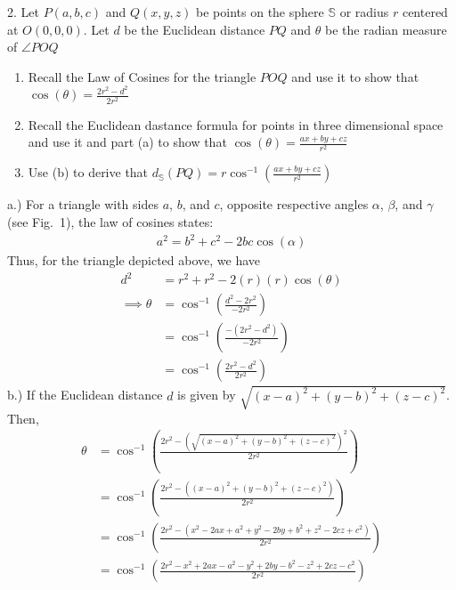 \documentclass{report}
\begin{document}
    \bigbreak \noindent 
    \begin{mdframed}
        2. Let $P(a,b,c)$ and $Q(x,y,z)$ be points on the sphere $\mathbb{S}$ or radius $r$ centered at $O(0,0,0)$. Let $d$ be the Euclidean distance $PQ$ and $\theta$ be the radian measure of $\angle POQ$
        \begin{enumerate}[label=(\alph*)]
            \item Recall the Law of Cosines for the triangle $POQ$  and use it to show that $\cos{\left(\theta \right)}  = \frac{2r^{2}-d^{2}}{2r^{2}}$
            \item Recall the Euclidean dastance formula for points in three dimensional space and use it and part (a) to show that $\cos{\left(\theta \right)}  = \frac{ax+by+cz}{r^{2}}$
            \item Use (b) to derive that $d_{\mathbb{S}}(PQ) = r\cos^{-1}{\left(\frac{ax+by+cz}{r^{2}}\right)}$
        \end{enumerate}
    \end{mdframed}
    \bigbreak \noindent 
    \begin{figure}[ht]
        \centering
        \label{fig:fig1}
    \end{figure}
    \bigbreak \noindent 
    a.) For a triangle with sides $a$, $b$, and $c$, opposite respective angles $\alpha$, $\beta$, and $\gamma$ (see Fig.~1), the law of cosines states:
    \begin{align*}
        a^{2} = b^{2} + c^{2} - 2bc\cos{\left(\alpha\right)}
    \end{align*}
    Thus, for the triangle depicted above, we have 
    \begin{align*}
        d^{2} &= r^{2} + r^{2} -2(r)(r)\cos{\left(\theta \right)} \\
        \implies \theta &= \cos^{-1}{\left(\frac{d^{2}-2r^{2}}{-2r^{2}}\right)} \\
                        &=\cos^{-1}{\left(\frac{-(2r^{2}-d^{2})}{-2r^{2}}\right)} \\
                        &=\cos^{-1}{\left(\frac{2r^{2}-d^{2}}{2r^{2}}\right)}
    \end{align*}
    b.) If the Euclidean distance $d$ is given by $\sqrt{(x-a)^{2} + (y-b)^{2} + (z-c)^{2}}$. Then,
    \begin{align*}
        \theta &= \cos^{-1}{\left(\frac{2r^{2}-\left(\sqrt{(x-a)^{2} + (y-b)^{2} +(z-c)^{2}}\right)^{2}}{2r^{2}}\right)} \\
               &= \cos^{-1}{\left(\frac{2r^{2} - \left((x-a)^{2} + (y-b)^{2} + (z-c)^{2}\right)}{2r^{2}}\right)} \\
               &= \cos^{-1}{\left(\frac{2r^{2} - (x^{2} -2ax + a^{2} +y^{2} - 2by + b^{2} + z^{2} - 2cz + c^{2})}{2r^{2}}\right)} \\
               &= \cos^{-1}{\left(\frac{2r^{2} -x^{2} + 2ax - a^{2}  -y^{2} +2by -b^{2} -z^{2} + 2cz - c^{2}}{2r^{2}}\right)}
    \end{align*}
\end{document}
